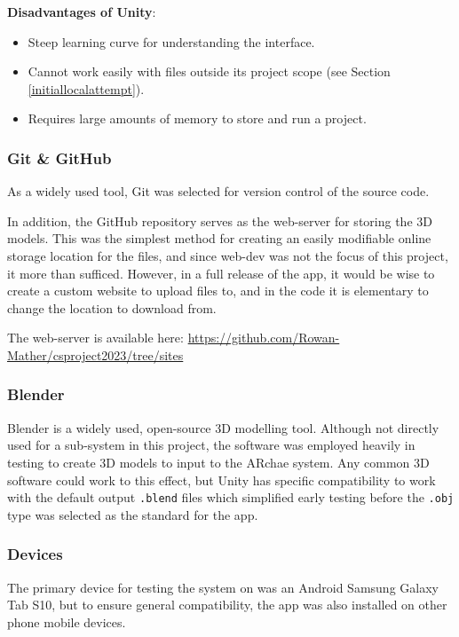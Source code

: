 \documentclass[12pt, a4paper]{article}
\begin{document}
\textbf{Disadvantages of Unity}:
\begin{itemize}
    \item Steep learning curve for understanding the interface.
    \item Cannot work easily with files outside its project scope (see Section \ref{initiallocalattempt}).
    \item Requires large amounts of memory to store and run a project.
\end{itemize}

\subsubsection{Git \& GitHub}
\label{gitandgithub}
As a widely used tool, Git was selected for version control of the source code. 

In addition, the GitHub repository serves as the web-server for storing the 3D models. This was the simplest method for creating an easily modifiable online storage location for the files, and since web-dev was not the focus of this project, it more than sufficed. However, in a full release of the app, it would be wise to create a custom website to upload files to, and in the code it is elementary to change the location to download from.

The web-server is available here: \url{https://github.com/Rowan-Mather/csproject2023/tree/sites} \cite{tools:repo}

\subsubsection{Blender}
Blender \cite{design:blender} is a widely used, open-source 3D modelling tool. Although not directly used for a sub-system in this project, the software was employed heavily in testing to create 3D models to input to the ARchae system. Any common 3D software could work to this effect, but Unity has specific compatibility to work with the default output \verb|.blend| files which simplified early testing before the \verb|.obj| type was selected as the standard for the app.

\subsubsection{Devices}
The primary device for testing the system on was an Android Samsung Galaxy Tab S10, but to ensure general compatibility, the app was also installed on other phone mobile devices. 
\end{document}
